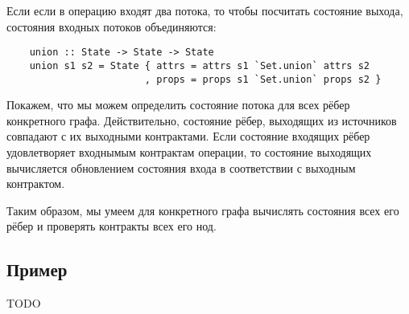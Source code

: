 Если если в операцию входят два потока, то чтобы посчитать состояние выхода, состояния входных потоков объединяются:

\begin{lstlisting}
    union :: State -> State -> State
    union s1 s2 = State { attrs = attrs s1 `Set.union` attrs s2
                        , props = props s1 `Set.union` props s2 }
\end{lstlisting}

Покажем, что мы можем определить состояние потока для всех рёбер конкретного графа. Действительно, состояние рёбер, выходящих из источников совпадают с их выходными контрактами. Если состояние входящих рёбер удовлетворяет входнымым контрактам операции, то состояние выходящих вычисляется обновлением состояния входа в соответствии с выходным контрактом.

Таким образом, мы умеем для конкретного графа вычислять состояния всех его рёбер и проверять контракты всех его нод.

\subsection{Пример}

TODO






